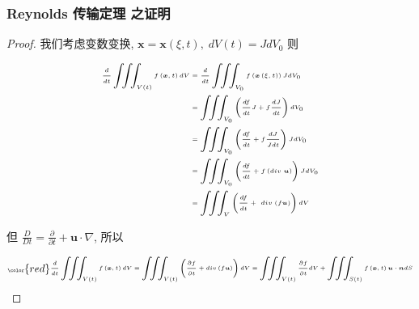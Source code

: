 \documentclass[aspectratio=2516]{beamer}
\begin{document}
\begin{frame}
\frametitle{\kaishu Reynolds 传输定理 \uppercase\expandafter{} 之证明}

\vspace{-0.5cm}

\begin{proof}
	
	\kaishu 
	
	\small 
	
	我们考虑变数变换, $\boldsymbol{x} = \boldsymbol{x}\left( {\xi ,t} \right),\;dV\left( t \right) = Jd{V_0}$ 则
	
	\vspace{-0.5cm}
	
	\begin{equation}
	\tiny 
	\begin{split}
	\frac{d}{{dt}}\iiint_{V\left( t \right)} {f\left( {\boldsymbol{x},t} \right)dV} & = \frac{d}{{dt}}\iiint_{{V_0}} {f\left( {\boldsymbol{x}\left( {\xi ,t} \right)} \right)Jd{V_0}}\\
	& = \iiint_{{V_0}} {\left( {\frac{{df}}{{dt}}J + f\frac{{dJ}}{{dt}}} \right)d{V_0}}\\
	& = \iiint_{{V_0}} {\left( {\frac{{df}}{{dt}} + f\frac{{dJ}}{{Jdt}}} \right)Jd{V_0}}\\
	& = \iiint_{{V_0}} {\left( {\frac{{df}}{{dt}} + f\left( {div\;\boldsymbol{u}} \right)} \right)Jd{V_0}}\\
	& = \iiint_V {\left( {\frac{{df}}{{dt}} + \ div\;(f\boldsymbol{u})} \right) dV}
	\end{split}
	\notag 
	\end{equation}
	
	\vspace{-0.5cm}
	
	但 $\frac{D}{{Dt}} = \frac{\partial }{{\partial t}} + \boldsymbol{u} \cdot \nabla $, 所以
	
	\vspace{-0.5cm}
	
	\begin{equation}
	\tiny 
	\color{red}
	\begin{split}
	\frac{d}{{dt}}\iiint_{V\left( t \right)} {f\left( {\boldsymbol{x},t} \right)dV}  = \iiint_{V\left( t \right)} {\left( {\frac{{\partial f}}{{\partial t}} + div\left( {f\boldsymbol{u}} \right)} \right)dV} = \iiint_{V\left( t \right)} {\frac{{\partial f}}{{\partial t}}dV} + \iiint_{S\left( t \right)} {f\left( {\boldsymbol{x},t} \right)\boldsymbol{u} \cdot \boldsymbol{n}dS}
	\end{split}
	\notag 
	\end{equation}
	
\end{proof}

\end{frame}
\end{document}
